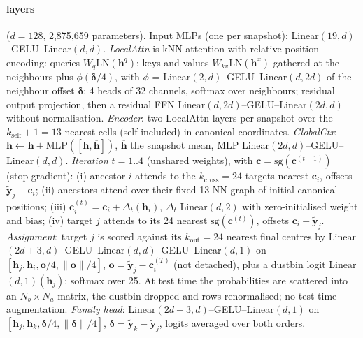 \paragraph{\ours layers} ($d{=}128$, 2{,}875{,}659 parameters).
Input MLPs (one per snapshot): Linear$(19,d)$--GELU--Linear$(d,d)$.
\emph{LocalAttn} is kNN attention with relative-position encoding: queries $W_q\mathrm{LN}(\mathbf{h}^q)$; keys and values $W_{kv}\mathrm{LN}(\mathbf{h}^x)$ gathered at the neighbours plus $\phi(\boldsymbol\delta/4)$, with $\phi$ = Linear$(2,d)$--GELU--Linear$(d,2d)$ of the neighbour offset $\boldsymbol\delta$; 4 heads of 32 channels, softmax over neighbours; residual output projection, then a residual FFN Linear$(d,2d)$--GELU--Linear$(2d,d)$ without normalisation.
\emph{Encoder}: two LocalAttn layers per snapshot over the $k_{\text{self}}{+}1{=}13$ nearest cells (self included) in canonical coordinates.
\emph{GlobalCtx}: $\mathbf{h}\leftarrow\mathbf{h}+\mathrm{MLP}([\mathbf{h},\overline{\mathbf{h}}])$, $\overline{\mathbf{h}}$ the snapshot mean, MLP Linear$(2d,d)$--GELU--Linear$(d,d)$.
\emph{Iteration} $t{=}1..4$ (unshared weights), with $\mathbf{c}=\mathrm{sg}(\mathbf{c}^{(t-1)})$ (stop-gradient):
(i) ancestor $i$ attends to the $k_{\text{cross}}{=}24$ targets nearest $\mathbf{c}_i$, offsets $\tilde{\mathbf{y}}_j{-}\mathbf{c}_i$;
(ii) ancestors attend over their fixed 13-NN graph of initial canonical positions;
(iii) $\mathbf{c}^{(t)}_i=\mathbf{c}_i+\Delta_t(\mathbf{h}_i)$, $\Delta_t$ Linear$(d,2)$ with zero-initialised weight and bias;
(iv) target $j$ attends to its 24 nearest $\mathrm{sg}(\mathbf{c}^{(t)})$, offsets $\mathbf{c}_i{-}\tilde{\mathbf{y}}_j$.
\emph{Assignment}: target $j$ is scored against its $k_{\text{out}}{=}24$ nearest final centres by Linear$(2d{+}3,d)$--GELU--Linear$(d,d)$--GELU--Linear$(d,1)$ on $[\mathbf{h}_j,\mathbf{h}_i,\mathbf{o}/4,\|\mathbf{o}\|/4]$, $\mathbf{o}=\tilde{\mathbf{y}}_j{-}\mathbf{c}^{(T)}_i$ (not detached), plus a dustbin logit Linear$(d,1)(\mathbf{h}_j)$; softmax over 25.
At test time the probabilities are scattered into an $N_b{\times}N_a$ matrix, the dustbin dropped and rows renormalised; no test-time augmentation.
\emph{Family head}: Linear$(2d{+}3,d)$--GELU--Linear$(d,1)$ on $[\mathbf{h}_j,\mathbf{h}_k,\boldsymbol\delta/4,\|\boldsymbol\delta\|/4]$, $\boldsymbol\delta=\tilde{\mathbf{y}}_k{-}\tilde{\mathbf{y}}_j$, logits averaged over both orders.

